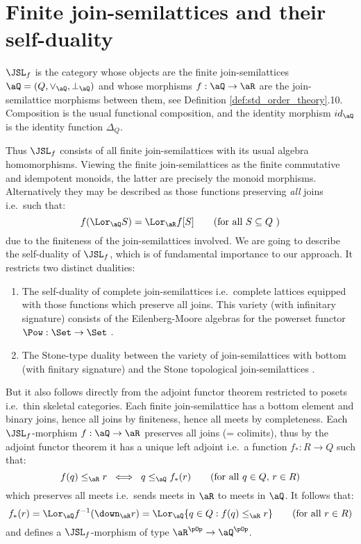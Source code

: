 \documentclass{article}
\begin{document}
\section{Finite join-semilattices and their self-duality}

\begin{definition}
$\JSL_f$ is the category whose objects are the finite join-semilattices $\aQ = (Q,\lor_\aQ,\bot_\aQ)$ and whose morphisms $f : \aQ \to \aR$ are the join-semilattice morphisms between them, see Definition \ref{def:std_order_theory}.10. Composition is the usual functional composition, and the identity morphism $id_\aQ$ is the identity function $\Delta_Q$. \endbox
\end{definition}

Thus $\JSL_f$ consists of all finite join-semilattices with its usual algebra homomorphisms. Viewing the finite join-semilattices as the finite commutative and idempotent monoids, the latter are precisely the monoid morphisms. Alternatively  they may be described as those functions preserving \emph{all} joins i.e.\ such that:
\[
f(\Lor_\aQ S) = \Lor_\aR f[S]
\qquad
\text{(for all $S \subseteq Q$ )}
\]
due to the finiteness of the join-semilattices involved. We are going to describe the self-duality of $\JSL_f$, which is of fundamental importance to our approach. It restricts two distinct dualities:

\begin{enumerate}
\item
The self-duality of complete join-semilattices i.e.\ complete lattices equipped with those functions which preserve all joins. This variety (with infinitary signature) consists of the Eilenberg-Moore algebras for the powerset functor $\Pow : \Set \to \Set$ \cite{CatsMaclane71}.

\item
The Stone-type duality between the variety of join-semilattices with bottom (with finitary signature) and the Stone topological join-semilattices \cite{StoneSpaces}.
\end{enumerate}

But it also follows directly from the adjoint functor theorem restricted to posets i.e.\ thin skeletal categories. Each finite join-semilattice has a bottom element and binary joins, hence all joins by finiteness, hence all meets by completeness. Each $\JSL_f$-morphism $f : \aQ \to \aR$ preserves all joins (= colimits), thus by the adjoint functor theorem it has a unique left adjoint i.e.\ a function  $f_* : R \to Q$ such that:
\[
f(q) \leq_\aR r
\;\iff\;
q \leq_\aQ f_*(r)
\qquad
(\text{for all $q \in Q$, $r \in R$})
\]
which preserves all meets i.e.\ sends meets in $\aR$ to meets in $\aQ$. It follows that:
\[
f_*(r) = \Lor_\aQ f^{-1}(\down_\aR r) = \Lor_\aQ \{ q \in Q : f(q) \leq_\aR r \}
\qquad
\text{(for all $r \in R$)}
\]
and defines a $\JSL_f$-morphism of type $\aR^{\pOp} \to \aQ^{\pOp}$.
\end{document}
